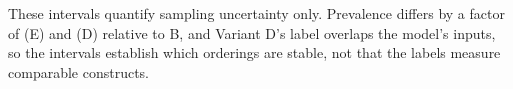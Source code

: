 These intervals quantify sampling uncertainty only. Prevalence differs by a
factor of \pcAltEventRatioPrimaryE{} (E) and \pcAltEventRatioPrimaryD{} (D)
relative to B, and Variant D's label overlaps the model's inputs, so the
intervals establish which orderings are stable, not that the labels measure
comparable constructs.
